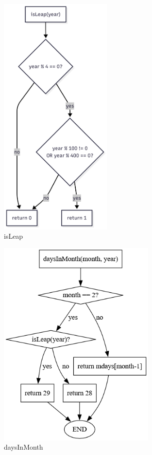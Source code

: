 \documentclass[a4paper,12pt]{article}
\begin{document}
\begin{figure}[H]
    \centering
    \includegraphics[width=0.5\textwidth]{diagrams/10.isLeap.png}
    \caption{isLeap}
    \label{fig:isLeap}
\end{figure}

\begin{figure}[H]
    \centering
    \includegraphics[width=0.7\textwidth]{diagrams/11.daysInMonth.png}
    \caption{daysInMonth}
    \label{fig:daysInMonth}
\end{figure}
\end{document}
